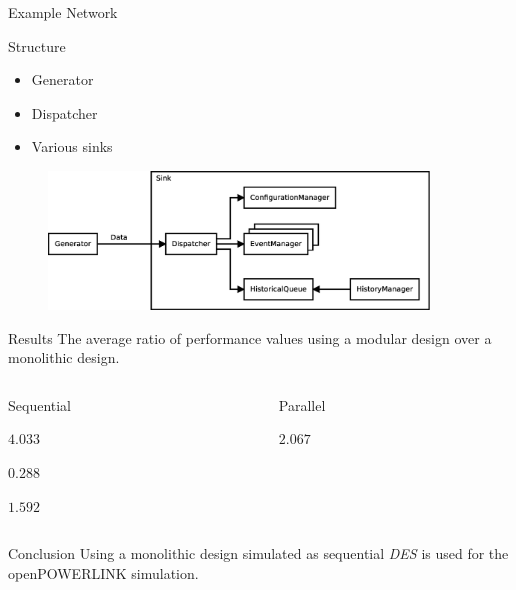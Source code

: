 \begin{frame}{Example Network}
    \begin{block}{Structure}
        \begin{multicols}{3}
            \begin{itemize}
                \item Generator
                \item Dispatcher
                \item Various sinks
            \end{itemize}
        \end{multicols}
    \end{block}
    
    \begin{figure}
        \includegraphics[width=0.9\textwidth]{../../thesis/images/design_test_network.eps}
    \end{figure}
\end{frame}

\begin{frame}{Results}
    The average ratio of performance values using a modular design over a monolithic design.
    \begin{columns}
        \begin{column}{0.48\textwidth}
            \begin{block}{Sequential\strut}
        \begin{description}
            \item[runtime] $4.033$
            \item[created events] $0.288$
            \item[real-time] $1.592$
        \end{description}
            \end{block}
        \end{column}
        \begin{column}{0.48\textwidth}
            \begin{block}{Parallel\strut}
                \begin{description}
                    \item[runtime] $2.067$
                \end{description}
            \end{block}
        \end{column}
    \end{columns}
    
    \begin{block}{Conclusion}
        Using a monolithic design simulated as sequential \emph{DES} is used for the openPOWERLINK simulation.
    \end{block}
    
\end{frame}